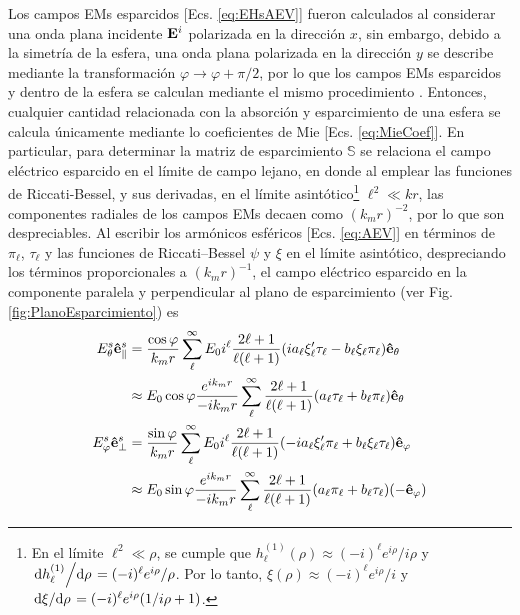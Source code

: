 Los campos EMs esparcidos [Ecs. \eqref{eq:EHsAEV}] fueron calculados al considerar una onda plana incidente $\vb{E}^i$ polarizada en la dirección $x$, sin embargo, debido a la simetría de la esfera, una onda plana polarizada en la dirección $y$ se describe mediante la transformación $\varphi\to\varphi+\pi/2$, por lo que los campos EMs esparcidos y dentro de la esfera se calculan mediante el mismo procedimiento \cite{bohren1998absorption}. Entonces, cualquier cantidad relacionada con la absorción y esparcimiento de una esfera se calcula únicamente mediante lo coeficientes de Mie [Ecs. \eqref{eq:MieCoef}]. En particular, para determinar la matriz de esparcimiento $\mathbb{S}$ se relaciona el campo eléctrico esparcido en el límite de campo lejano, en donde al emplear las funciones de Riccati-Bessel, y sus derivadas, en el límite asintótico\footnote{En el límite $\ell^2 \ll \rho$, se cumple que $h_\ell^{(1)}(\rho)\approx (-i)^\ell e^{i\rho}/i\rho$ y $\dv*{h_\ell^{(1)}}{\rho} = (-i)^\ell e^{i\rho}/\rho$. Por lo tanto,  $\xi(\rho)\approx (-i)^\ell e^{i\rho}/i$ y $\dv*{\xi}{\rho} = (-i)^\ell e^{i\rho}(1/i\rho + 1)$.} $\ell^2 \ll kr$, las componentes radiales de los campos EMs decaen como $(k_mr)^{-2}$, por lo que son despreciables. Al escribir los armónicos esféricos  [Ecs. \eqref{eq:AEV}] en términos de $\pi_\ell$, $\tau_\ell$ y las funciones de Riccati--Bessel $\psi$ y $\xi$ en el límite asintótico, despreciando los términos proporcionales a $(k_mr)^{-1}$, el campo eléctrico esparcido en la componente paralela y perpendicular al plano de esparcimiento (ver Fig. \ref{fig:PlanoEsparcimiento}) es
	\begin{subequations}
	\begin{align}
	E_\theta^s \vu{e}_\parallel^s &=\frac{\cos\varphi}{k_mr}
								\sum_\ell^\infty E_0i^\ell\frac{2\ell+1}{\ell(\ell+1)}
						(i a_\ell\xi_\ell'\tau_\ell-b_\ell\xi_\ell\pi_\ell)\vu{e}_\theta\notag\\
			&\approx E_0\cos\varphi\frac{e^{ik_mr}}{-ik_mr}\sum_\ell^\infty\frac{2\ell+1}{\ell(\ell+1)}
				( a_\ell \tau_\ell + b_\ell\pi_\ell )\vu{e}_\theta 
				\label{seq:EsFF}\\
		E_\varphi^s \vu{e}_\perp^s &= \frac{\sin\varphi}{k_mr}
							\sum_\ell^\infty E_0i^\ell\frac{2\ell+1}{\ell(\ell+1)}						
							(-ia_\ell\xi_\ell'\pi_\ell+b_\ell\xi_\ell\tau_\ell)\vu{e}_\varphi \notag\\
			&\approx E_0\sin\varphi\frac{e^{ik_mr}}{-ik_mr}\sum_\ell^\infty\frac{2\ell+1}{\ell(\ell+1)}					(a_\ell\pi_\ell+b_\ell\tau_\ell)(-\vu{e}_\varphi) \label{seq:HsFF}
	\end{align}\label{eq:EHsFF}
	\end{subequations}
